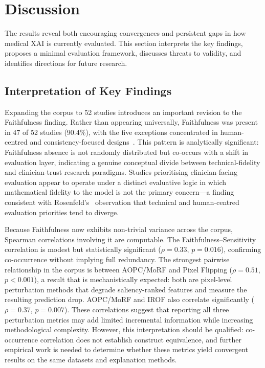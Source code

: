 \section{Discussion}

The results reveal both encouraging convergences and persistent gaps in how
medical XAI is currently evaluated. This section interprets the key findings,
proposes a minimal evaluation framework, discusses threats to validity, and
identifies directions for future research.

\subsection{Interpretation of Key Findings}

Expanding the corpus to 52 studies introduces an important revision to the
Faithfulness finding. Rather than appearing universally, Faithfulness was
present in 47 of 52 studies (90.4\%), with the five exceptions
concentrated in human-centred and consistency-focused
designs~\cite{rezaeian2026explainability,finzel2024human,bauer2025human,qin2025consistency,alpsalaz2026explainability}.
This pattern is analytically significant: Faithfulness absence is not
randomly distributed but co-occurs with a shift in evaluation layer,
indicating a genuine conceptual divide between technical-fidelity and
clinician-trust research paradigms. Studies prioritising clinician-facing
evaluation appear to operate under a distinct evaluative logic in which
mathematical fidelity to the model is not the primary concern---a finding
consistent with Rosenfeld's~\cite{rosenfeld2021better} observation that
technical and human-centred evaluation priorities tend to diverge.

Because Faithfulness now exhibits non-trivial variance across the corpus,
Spearman correlations involving it are computable. The
Faithfulness--Sensitivity correlation is modest but statistically significant
($\rho = 0.33$, $p = 0.016$), confirming co-occurrence without implying full
redundancy. The strongest pairwise relationship in the corpus is between
AOPC/MoRF and Pixel Flipping ($\rho = 0.51$, $p < 0.001$), a result that is
mechanistically expected: both are pixel-level perturbation methods that
degrade saliency-ranked features and measure the resulting prediction drop.
AOPC/MoRF and IROF also correlate significantly ($\rho = 0.37$, $p = 0.007$).
These correlations suggest that reporting all three perturbation metrics may
add limited incremental information while increasing methodological
complexity. However, this interpretation should be qualified: co-occurrence
correlation does not establish construct equivalence, and further empirical
work is needed to determine whether these metrics yield convergent results
on the same datasets and explanation methods.

